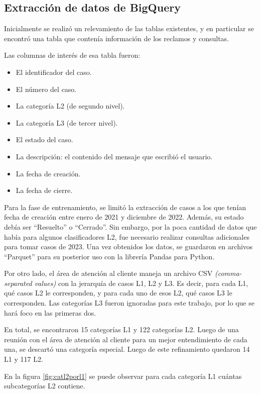 \subsection{Extracción de datos de BigQuery}

Inicialmente se realizó un relevamiento de las tablas existentes, y en particular se encontró una tabla que contenía información de los reclamos y consultas. 

Las columnas de interés de esa tabla fueron:
\begin{itemize}
	\item El identificador del caso.
	\item El número del caso.
	\item La categoría L2 (de segundo nivel).
	\item La categoría L3 (de tercer nivel).
	\item El estado del caso.
	\item La descripción: el contenido del mensaje que escribió el usuario.
	\item La fecha de creación.
	\item La fecha de cierre.
\end{itemize}

Para la fase de entrenamiento, se limitó la extracción de casos a los que tenían fecha de creación entre enero de 2021 y diciembre de 2022. Además, su estado debía ser ``Resuelto'' o ``Cerrado''. Sin embargo, por la poca cantidad de datos que había para algunos clasificadores L2, fue necesario realizar consultas adicionales para tomar casos de 2023. Una vez obtenidos los datos, se guardaron en archivos ``Parquet'' para su posterior uso con la librería Pandas para Python.

Por otro lado, el área de atención al cliente maneja un archivo CSV \textit{(comma-separated values)} con la jerarquía de casos L1, L2 y L3. Es decir, para cada L1, qué casos L2 le corresponden, y para cada uno de esos L2, qué casos L3 le corresponden. Las categorías L3 fueron ignoradas para este trabajo, por lo que se hará foco en las primeras dos.

En total, se encontraron 15 categorías L1 y 122 categorías L2. Luego de una reunión con el área de atención al cliente para un mejor entendimiento de cada una, se descartó una categoría especial. Luego de este refinamiento quedaron 14 L1 y 117 L2.

En la figura \ref{fig:catl2porl1} se puede observar para cada categoría L1 cuántas subcategorías L2 contiene.

